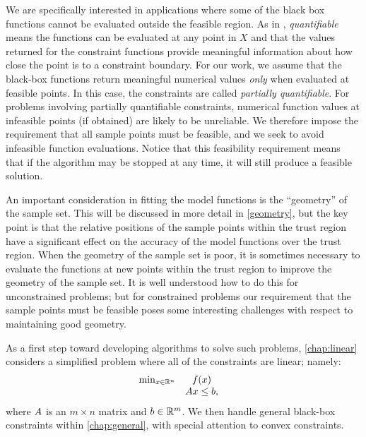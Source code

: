 We are specifically interested in applications where some of the black box functions cannot be evaluated outside the feasible region.
As in \cite{digabel2015taxonomy}, {\em quantifiable} means the functions can be evaluated at any point in $X$ and that the values returned for the constraint functions provide meaningful information about how close the point is to a constraint boundary.
For our work, we assume that the black-box functions return meaningful numerical values \emph{only} when evaluated at feasible points.
In this case,  the constraints are called {\em partially quantifiable}.    
For problems involving partially quantifiable constraints,  numerical function values at infeasible points (if obtained) are likely to be unreliable.   We therefore impose 
the requirement that all sample points must be feasible, and we seek to avoid infeasible function evaluations.
Notice that this feasibility requirement means that if the algorithm may be stopped at any time, it will still produce a feasible solution.


An important consideration in fitting the model functions is the ``geometry'' of the sample set.
This will be discussed in more detail in \cref{geometry}, but the key point is that the relative positions of the sample points within the trust region have a significant effect on the accuracy of the model functions over the trust region.
When the geometry of the sample set is poor, it is sometimes necessary to evaluate the functions at new points within the trust region to improve the geometry of the sample set.
It is well understood how to do this for unconstrained problems; but for constrained problems
our requirement that the sample points must be feasible  poses some interesting challenges with respect to maintaining good geometry.   

As a first step toward developing algorithms to solve such problems,  \cref{chap:linear}  considers a simplified problem where all of the constraints are linear; namely:
\begin{equation}
\begin{array}{ccl} \min_{x \in \mathbb R^n} & f(x) \\
& {A} x \le {b}, & 
\end{array}
\end{equation}
where ${A}$ is an $m \times n$ matrix and ${b} \in \mathbb R^m$.
We then handle general black-box constraints within \cref{chap:general}, with special attention to convex constraints.


